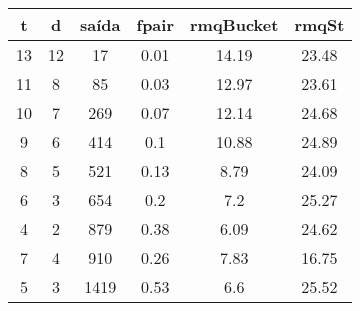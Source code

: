 \begin{tabular}{|c|c|c|c|c|c|}
\hline
\textbf{t} & \textbf{d} & \textbf{saída} & \textbf{fpair} & \textbf{rmqBucket} & \textbf{rmqSt}\\
\hline
13 & 12 & 17 & 0.01 & 14.19 & 23.48\\
\hline
11 & 8 & 85 & 0.03 & 12.97 & 23.61\\
\hline
10 & 7 & 269 & 0.07 & 12.14 & 24.68\\
\hline
9 & 6 & 414 & 0.1 & 10.88 & 24.89\\
\hline
8 & 5 & 521 & 0.13 & 8.79 & 24.09\\
\hline
6 & 3 & 654 & 0.2 & 7.2 & 25.27\\
\hline
4 & 2 & 879 & 0.38 & 6.09 & 24.62\\
\hline
7 & 4 & 910 & 0.26 & 7.83 & 16.75\\
\hline
5 & 3 & 1419 & 0.53 & 6.6 & 25.52\\
\hline
\end{tabular}
